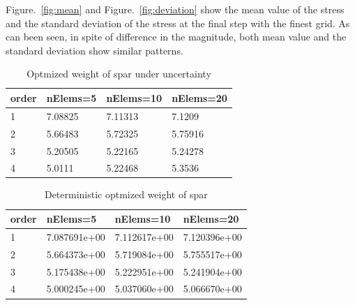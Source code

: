 \documentclass[a4paper]{article}
\begin{document}
Figure.~\ref{fig:mean} and Figure.~\ref{fig:deviation} show the mean value of the stress and the standard deviation of the stress at the final step with the finest grid. As can been seen, in spite of difference in the magnitude, both mean value and the standard deviation show similar patterns.

\begin{table}[h]
  \begin{center}
    \caption[]{Optmized weight of spar under uncertainty} \label{tb:weight}
    \begin{tabular}{p{}p{}p{}p{}}
      \hline
      order&      nElems=5  & nElems=10   & nElems=20 \\
      \hline
      1&          7.08825 &  7.11313&    7.1209 \\
      2&          5.66483 &  5.72325 &   5.75916  \\
      3&          5.20505&   5.22165&     5.24278    \\
      4&          5.0111&   5.22468&     5.3536\\
      \hline
    \end{tabular}
  \end{center}
\end{table}
\begin{table}[h]
  \begin{center}
    \caption[]{Deterministic optmized weight of spar} \label{tb:weight_old}
    \begin{tabular}{p{}p{}p{}p{}}
      \hline
      order&      nElems=5  & nElems=10   & nElems=20 \\
      \hline
      1&          7.087691e+00 &  7.112617e+00 &   7.120396e+00  \\
      2&          5.664373e+00 &  5.719084e+00&    5.755517e+00 \\
      3&          5.175438e+00&   5.222951e+00&     5.241904e+00    \\
      4&          5.000245e+00&   5.037060e+00&     5.066670e+00\\
      \hline
    \end{tabular}
  \end{center}
\end{table}
\end{document}
